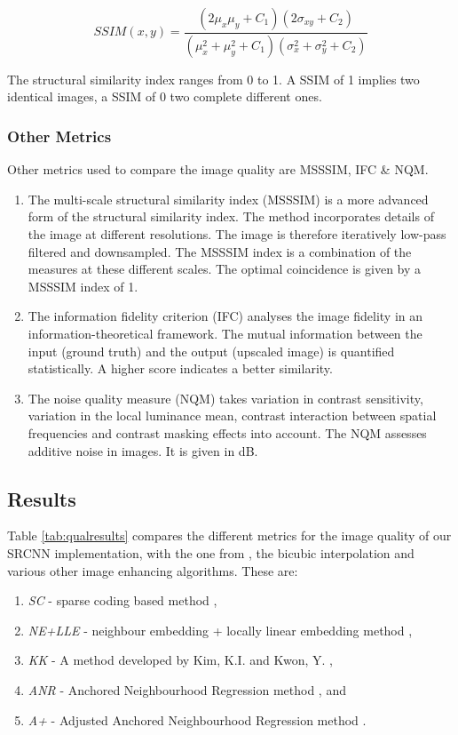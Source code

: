 \documentclass[
			fontsize = 12pt,
			paper = a4
			]
			{scrartcl}%
\newcommand{\?}{\ensuremath{^\texttt{\textbf [CITATION~NEEDED]}}}
\begin{document}
\begin{equation}
    SSIM(x,y) = \frac{(2\mu_x\mu_y + C_1)(2\sigma_{xy} + C_2)}{(\mu_x^2 + \mu_y^2 + C_1)(\sigma_x^2+\sigma_y^2+C_2)}
    \label{eq:ssim}
\end{equation}

 The structural similarity index ranges from 0 to 1. A SSIM of 1 implies two identical images, a SSIM of 0 two complete different ones. \cite{ssim}

\subsubsection{Other Metrics}
\label{sec:othermetrics}

Other metrics used to compare the image quality are MSSSIM, IFC \& NQM. 
\begin{enumerate}
    \item The multi-scale structural similarity index (MSSSIM) is a more advanced form of the structural similarity index. The method incorporates details of the image at different resolutions. The image is therefore iteratively low-pass filtered and downsampled. The MSSSIM index is a combination of the measures at these different scales. The optimal coincidence is given by a MSSSIM index of 1. \cite{MSSSIM}
    \item The information fidelity criterion (IFC) analyses the image fidelity in an information-theoretical framework. The mutual information between the input (ground truth) and the output (upscaled image) is quantified statistically. A higher score indicates a better similarity. \cite{IFC}
    \item The noise quality measure (NQM) takes variation in contrast sensitivity, variation in the local luminance mean, contrast interaction between spatial frequencies and contrast masking effects into account. The NQM assesses additive noise in images. It is given in dB. \cite{NQM}
\end{enumerate}

\subsection{Results}
\label{sec:imqualresults}
Table \ref{tab:qualresults} compares the different metrics for the image quality of our SRCNN implementation, with the one from \cite{dong2015image}, the bicubic interpolation and various other image enhancing algorithms. These are:
\begin{enumerate}
    \item \textit{SC} - sparse coding based method \cite{SC},
    \item \textit{NE+LLE} - neighbour embedding + locally linear embedding method \cite{NELLE},
    \item \textit{KK} - A method developed by Kim, K.I. and Kwon, Y. \cite{KK},
    \item \textit{ANR} - Anchored Neighbourhood Regression method \cite{ANR}, and
    \item \textit{A+} - Adjusted Anchored Neighbourhood Regression method \cite{A+}.
\end{enumerate}
\end{document}
